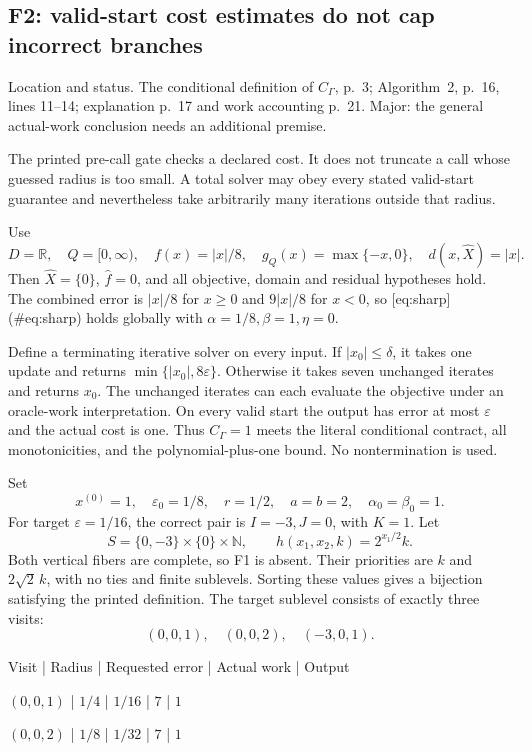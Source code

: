 \documentclass[10pt]{article}
\begin{document}
\subsection*{F2: valid-start cost estimates do not cap incorrect branches}
Location and status. The conditional definition of \(C_\Gamma\), p. 3; Algorithm 2, p. 16, lines 11–14; explanation p. 17 and work accounting p. 21. Major: the general actual-work conclusion needs an additional premise.\par
The printed pre-call gate checks a declared cost. It does not truncate a call whose guessed radius is too small. A total solver may obey every stated valid-start guarantee and nevertheless take arbitrarily many iterations outside that radius.\par
Use \[D=\mathbb R,\quad Q=[0,\infty),\quad f(x)=|x|/8,\quad
 g_Q(x)=\max\{-x,0\},\quad d(x,\widehat X)=|x|.\] Then \(\widehat X=\{0\}\), \(\widehat f=0\), and all objective, domain and residual hypotheses hold. The combined error is \(|x|/8\) for \(x\ge0\) and \(9|x|/8\) for \(x<0\), so [eq:sharp] (\#eq:sharp) holds globally with \(\alpha=1/8,\beta=1,\eta=0\).\par
Define a terminating iterative solver on every input. If \(|x_0|\le\delta\), it takes one update and returns \(\min\{|x_0|,8\varepsilon\}\). Otherwise it takes seven unchanged iterates and returns \(x_0\). The unchanged iterates can each evaluate the objective under an oracle-work interpretation. On every valid start the output has error at most \(\varepsilon\) and the actual cost is one. Thus \(C_\Gamma=1\) meets the literal conditional contract, all monotonicities, and the polynomial-plus-one bound. No nontermination is used.\par
Set \[x^{(0)}=1,\quad \varepsilon_0=1/8,\quad
 r=1/2,\quad a=b=2,\quad \alpha_0=\beta_0=1.\] For target \(\varepsilon=1/16\), the correct pair is \(I=-3,J=0\), with \(K=1\). Let \[S=\{0,-3\}\times\{0\}\times\mathbb N,\qquad
 h(x_1,x_2,k)=2^{x_1/2}k.\] Both vertical fibers are complete, so F1 is absent. Their priorities are \(k\) and \(2\sqrt2\,k\), with no ties and finite sublevels. Sorting these values gives a bijection satisfying the printed definition. The target sublevel consists of exactly three visits: \[(0,0,1),\quad (0,0,2),\quad (-3,0,1).\]\par
Visit | Radius | Requested error | Actual work | Output\par
\((0,0,1)\) | \(1/4\) | \(1/16\) | \(7\) | \(1\)\par
\((0,0,2)\) | \(1/8\) | \(1/32\) | \(7\) | \(1\)\par
\end{document}
